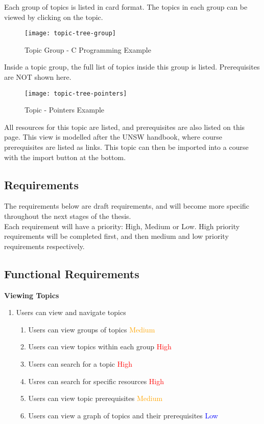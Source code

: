 Each group of topics is listed in card format. The topics in each group can be viewed by clicking on the topic.\\

\begin{figure}[h!]
    \centering
    \texttt{[image: topic-tree-group]}
    \caption{Topic Group - C Programming Example}
\end{figure}
\newpage

Inside a topic group, the full list of topics inside this group is listed. Prerequisites are NOT shown here. \\

\begin{figure}[h!]
    \centering
    \texttt{[image: topic-tree-pointers]}
    \caption{Topic - Pointers Example}
\end{figure}

All resources for this topic are listed, and prerequisites are also listed on this page. This view is modelled after the UNSW handbook, where course prerequisites are listed as links. This topic can then be imported into a course with the import button at the bottom.\\

\subsection{Requirements}
The requirements below are draft requirements, and will become more specific throughout the next stages of the thesis.\\
Each requirement will have a priority: High, Medium or Low. High priority requirements will be completed first, and then medium and low priority requirements respectively. \\

\subsection{Functional Requirements}

\textbf{Viewing Topics}
\begin{enumerate}
\item Users can view and navigate topics
    \begin{enumerate}
    \item Users can view groups of topics \textcolor{Orange}{Medium}
    \item Users can view topics within each group \textcolor{Red}{High}
    \item Users can search for a topic \textcolor{Red}{High}
    \item Usres can search for specific resources \textcolor{Red}{High}
    \item Users can view topic prerequisites \textcolor{Orange}{Medium}
    \item Users can view a graph of topics and their prerequisites \textcolor{Blue}{Low}
    \end{enumerate}
\end{enumerate}

